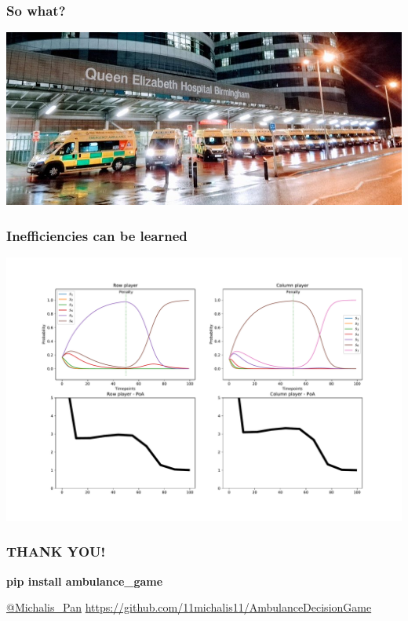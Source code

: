 \begin{frame}
    \frametitle{So what?}

    \centering
    \includegraphics[scale=0.45]{Bin/ambulance_queue.jpg}

\end{frame}


\begin{frame}
    \frametitle{Inefficiencies can be learned}
    \centering

    \includegraphics[scale=0.28]{Bin/penalised_game.pdf}

\end{frame}


\begin{frame}
    \frametitle{THANK YOU!}
    \centering
    \color{orange}

    
    \textbf{pip install ambulance\_game}
    
    \vspace{0.5cm}

    \url{@Michalis_Pan}
    \url{https://github.com/11michalis11/AmbulanceDecisionGame}
    

\end{frame}